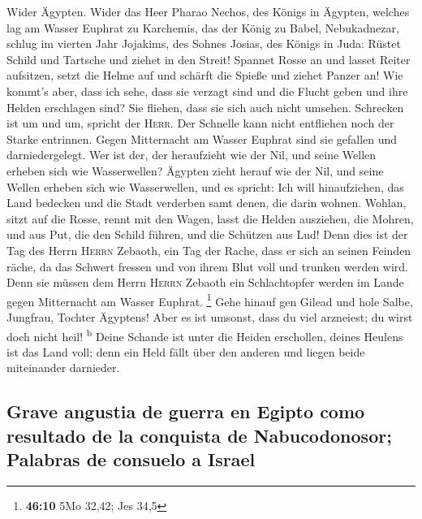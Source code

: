  Wider Ägypten. Wider das Heer Pharao Nechos, des Königs
in Ägypten, welches lag am Wasser Euphrat zu Karchemis, das der König zu
Babel, Nebukadnezar, schlug im vierten Jahr Jojakims, des Sohnes Josias,
des Königs in Juda:  Rüstet Schild und Tartsche und ziehet
in den Streit!  Spannet Rosse an und lasset Reiter
aufsitzen, setzt die Helme auf und schärft die Spieße und ziehet Panzer
an!  Wie kommt's aber, dass ich sehe, dass sie verzagt
sind und die Flucht geben und ihre Helden erschlagen sind? Sie fliehen,
dass sie sich auch nicht umsehen. Schrecken ist um und um, spricht der
\textsc{Herr}.  Der Schnelle kann nicht entfliehen noch
der Starke entrinnen. Gegen Mitternacht am Wasser Euphrat sind sie
gefallen und darniedergelegt.  Wer ist der, der
heraufzieht wie der Nil, und seine Wellen erheben sich wie Wasserwellen?
 Ägypten zieht herauf wie der Nil, und seine Wellen
erheben sich wie Wasserwellen, und es spricht: Ich will hinaufziehen,
das Land bedecken und die Stadt verderben samt denen, die darin wohnen.
 Wohlan, sitzt auf die Rosse, rennt mit den Wagen, lasst
die Helden ausziehen, die Mohren, und aus Put, die den Schild führen,
und die Schützen aus Lud!  Denn dies ist der Tag des
Herrn \textsc{Herrn} Zebaoth, ein Tag der Rache, dass er sich an seinen
Feinden räche, da das Schwert fressen und von ihrem Blut voll und
trunken werden wird. Denn sie müssen dem Herrn \textsc{Herrn} Zebaoth
ein Schlachtopfer werden im Lande gegen Mitternacht am Wasser Euphrat.
\footnote{\textbf{46:10} 5Mo 32,42; Jes 34,5}  Gehe
hinauf gen Gilead und hole Salbe, Jungfrau, Tochter Ägyptens! Aber es
ist umsonst, dass du viel arzneiest; du wirst doch nicht heil!
\textsuperscript{b}  Deine Schande ist unter die Heiden
erschollen, deines Heulens ist das Land voll; denn ein Held fällt über
den anderen und liegen beide miteinander darnieder.

\hypertarget{grave-angustia-de-guerra-en-egipto-como-resultado-de-la-conquista-de-nabucodonosor-palabras-de-consuelo-a-israel}{%
\subsection{Grave angustia de guerra en Egipto como resultado de la
conquista de Nabucodonosor; Palabras de consuelo a
Israel}\label{grave-angustia-de-guerra-en-egipto-como-resultado-de-la-conquista-de-nabucodonosor-palabras-de-consuelo-a-israel}}

